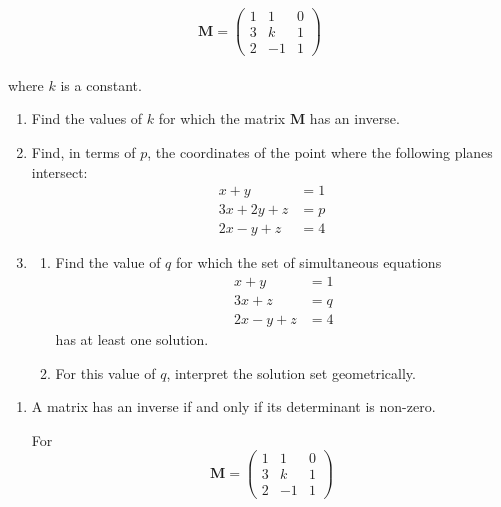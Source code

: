\documentclass[leqno]{article}
\begin{document}
\begin{enumerate}[
  label=\textbf{\arabic*.},
  leftmargin=*,
  topsep=0pt,
  partopsep=0pt,
  parsep=0pt
]
\[
\mathbf{M}=\begin{pmatrix}
1&1&0\\
3&k&1\\
2&-1&1
\end{pmatrix}
\] \\
where $k$ is a constant. \\
\begin{enumerate}[label=\textbf{(\alph*)}]
  \item Find the values of $k$ for which the matrix $\mathbf{M}$ has an inverse.  \\
  \item Find, in terms of $p$, the coordinates of the point where the following planes intersect:
  \[
  \begin{aligned}
  x+y&=1\\
  3x+2y+z&=p\\
  2x-y+z&=4
  \end{aligned}
  \]
  \item
  \begin{enumerate}[label=(\roman*)]
    \item Find the value of $q$ for which the set of simultaneous equations
    \[
    \begin{aligned}
    x+y&=1\\
    3x+z&=q\\
    2x-y+z&=4
    \end{aligned}
    \]
    has at least one solution. 
    \item For this value of $q$, interpret the solution set geometrically.  \\
  \end{enumerate}
\end{enumerate}

\vspace*{10pt}

\begin{djsSolution}
\begin{enumerate}[label=\textbf{(\alph*)}]
  \item A matrix has an inverse if and only if its determinant is non-zero.

  For
  \[
  \mathbf{M}=\begin{pmatrix}
  1 & 1 & 0\\
  3 & k & 1\\
  2 & -1 & 1
  \end{pmatrix}
  \]


\end{enumerate}
\end{djsSolution}
\end{enumerate}
\end{document}
